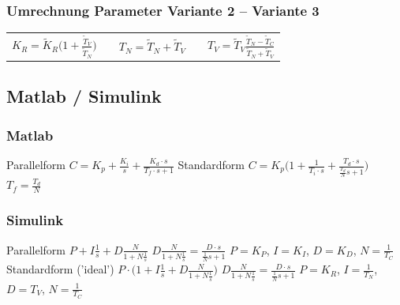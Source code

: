 \subsubsection{Umrechnung Parameter Variante 2 -- Variante 3}

\begin{tabular}{c c c c c}
    $K_R = \tilde{K}_R \Big( 1 + \frac{\tilde{T}_V}{\tilde{T}_N} \Big)$ & &
    $T_N = \tilde{T}_N + \tilde{T}_V$ & &
    $T_V = \tilde{T}_V \frac{\tilde{T}_N - \tilde{T}_C}{\tilde{T}_N + \tilde{T}_V}$ 
\end{tabular}

\subsection{Matlab / Simulink}

\begin{minipage}[t]{0.45\columnwidth}
    \subsubsection*{Matlab}

    \begin{outline}
        \1 Parallelform
            \2 
            \2 $C = K_p + \frac{K_i}{s} + \frac{K_d \cdot s}{T_f \cdot s + 1}$
        \1 Standardform
            \2 
            \2 $C = K_p \Big( 1 + \frac{1}{T_i \cdot s} + \frac{T_d \cdot s}{\frac{T_d}{N} s + 1} \Big)$
            \2 $T_f = \frac{T_d}{N}$
    \end{outline}
\end{minipage}
\hfill
\begin{minipage}[t]{0.53\columnwidth}
    \subsubsection*{Simulink}

    \begin{outline}
        \1 Parallelform
        \2 $P + I \frac{1}{s} + D \frac{N}{1 + N \frac{1}{s}}$
        \2 $D \frac{N}{1 + N \frac{1}{s}} = \frac{D \cdot s}{\frac{1}{N} s + 1}$
        \2 $P = K_P$, $I = K_I$, $D = K_D$, $N = \frac{1}{T_C}$
    \1 Standardform ('ideal')
        \2 $P \cdot \Big( 1 + I \frac{1}{s} + D \frac{N}{1 + N \frac{1}{s}} \Big)$
        \2 $D \frac{N}{1 + N \frac{1}{s}} = \frac{D \cdot s}{\frac{1}{N} s + 1}$
        \2 $P = K_R$, $I = \frac{1}{T_N}$, $D = T_V$, $N = \frac{1}{T_C}$
    \end{outline}
\end{minipage}


